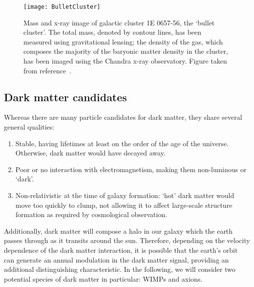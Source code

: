 			\begin{figure}
				\centering
				\texttt{[image: BulletCluster]}
				\caption[Mass and x-ray image of the `bullet cluster', galactic cluster 1E 0657-56.]{Mass and x-ray image of 
				galactic cluster 1E 0657-56, 
				the `bullet cluster'.   The total mass, denoted by contour lines, has been measured using gravitational lensing; 
				the density of the gas, which composes the majority of the baryonic matter density in the cluster, has been 
				imaged using the Chandra x-ray observatory.  %
				Figure taken from reference~\cite{Clowe06}.}
				\label{fig:DMBulletCluster}
			\end{figure}	
	
		\subsection{Dark matter candidates}
	
	Whereas there are many particle candidates for dark matter, they share several general qualities:

	
	
			\begin{enumerate}	
				\item Stable, having lifetimes at least on the order of the age of the universe.  Otherwise, dark matter would have
				decayed away.  
				\item Poor or no interaction with electromagnetism, making them non-luminous or `dark'.
				\item Non-relativistic at the time of galaxy formation: `hot' dark matter would move too quickly to clump, 
				not allowing it to affect large-scale structure formation as required by cosmological observation.  
			\end{enumerate}		

Additionally, dark matter will compose a halo in our galaxy which the earth passes through as it transits around the sun.  Therefore, depending on the velocity dependence of the dark matter interaction, it is possible that the earth's orbit can generate an annual modulation in the dark matter signal, providing an additional distinguishing characteristic.  In the following, we will consider two potential species of dark matter in particular: WIMPs and axions. 
